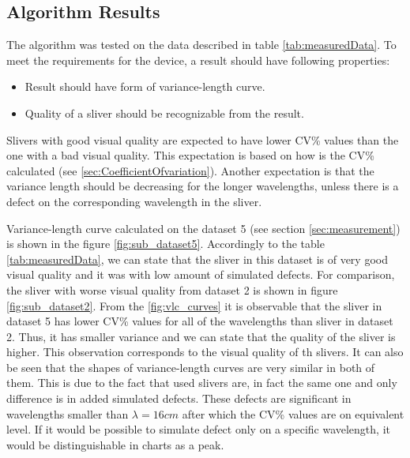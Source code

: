 \documentclass[twoside]{ctuthesis}
\theoremstyle{plain}
\theoremstyle{definition}
\theoremstyle{note}
\begin{document}
\subsection{Algorithm Results}
The algorithm was tested on the data described in table \ref{tab:measuredData}. To meet the requirements for the device, a result should have following properties:
\begin{itemize}
	\setlength{\itemsep}{5pt}
	\item Result should have form of variance-length curve.
	\item Quality of a sliver should be recognizable from the result.
\end{itemize}

Slivers with good visual quality are expected to have lower CV\% values than the one with a bad visual quality. This expectation is based on how is the CV\% calculated (see \ref{sec:CoefficientOfvariation}). Another expectation is that the variance length should be decreasing for the longer wavelengths, unless there is a defect on the corresponding wavelength in the sliver.

Variance-length curve calculated on the dataset 5 (see section \ref{sec:measurement}) is shown in the figure \ref{fig:sub_dataset5}. Accordingly to the table \ref{tab:measuredData}, we can state that the sliver in this dataset is of very good visual quality and it was with low amount of simulated defects. For comparison, the sliver with worse visual quality from dataset 2 is shown in figure \ref{fig:sub_dataset2}. From the \ref{fig:vlc_curves} it is observable that the sliver in dataset 5 has lower CV\% values for all of the wavelengths than sliver in dataset 2. Thus, it has smaller variance and we can state that the quality of the sliver is higher. This observation corresponds to the visual quality of th slivers.
It can also be seen that the shapes of variance-length curves are very similar in both of them. This is due to the fact that used slivers are, in fact the same one and only difference is in added simulated defects. These defects are significant in wavelengths smaller than $\lambda=16cm$ after which the CV\% values are on equivalent level. If it would be possible to simulate defect only on a specific wavelength, it would be distinguishable in charts as a peak. 
\end{document}
